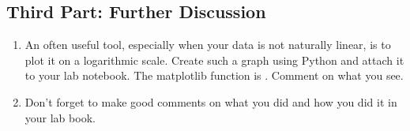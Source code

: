 \documentclass[twoside,11pt,ShortChapTitles]{BYUTextbook}
\begin{document}
\subsection{Third Part: Further Discussion}

\begin{enumerate}
\item An often useful tool, especially when your data is not naturally linear,
is to plot it on a logarithmic scale. Create such a graph using Python and attach it to your lab notebook.  The matplotlib function is . Comment on what you see.

\item Don't forget to make good comments on what you did and how you did it in
your lab book.
\end{enumerate}
\end{document}
